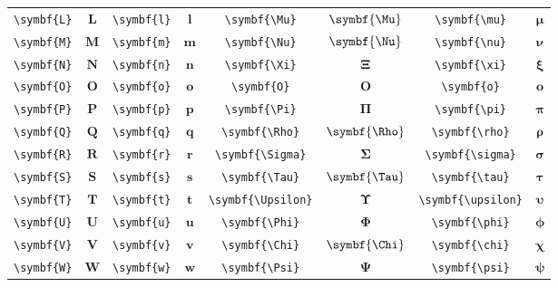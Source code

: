 \begin{longtable}{cccccccc}
    \verb|\symbf{L}| & \(\symbf{L}\) & \verb|\symbf{l}| & \(\symbf{l}\) & \verb|\symbf{\Mu}|      & \(\symbf{\Mu}\)      & \verb|\symbf{\mu}|         & \(\symbf{\mu}\)         \\
    \verb|\symbf{M}| & \(\symbf{M}\) & \verb|\symbf{m}| & \(\symbf{m}\) & \verb|\symbf{\Nu}|      & \(\symbf{\Nu}\)      & \verb|\symbf{\nu}|         & \(\symbf{\nu}\)         \\
    \verb|\symbf{N}| & \(\symbf{N}\) & \verb|\symbf{n}| & \(\symbf{n}\) & \verb|\symbf{\Xi}|      & \(\symbf{\Xi}\)      & \verb|\symbf{\xi}|         & \(\symbf{\xi}\)         \\
    \verb|\symbf{O}| & \(\symbf{O}\) & \verb|\symbf{o}| & \(\symbf{o}\) & \verb|\symbf{O}|        & \(\symbf{O}\)        & \verb|\symbf{o}|           & \(\symbf{o}\)           \\
    \verb|\symbf{P}| & \(\symbf{P}\) & \verb|\symbf{p}| & \(\symbf{p}\) & \verb|\symbf{\Pi}|      & \(\symbf{\Pi}\)      & \verb|\symbf{\pi}|         & \(\symbf{\pi}\)         \\
    \verb|\symbf{Q}| & \(\symbf{Q}\) & \verb|\symbf{q}| & \(\symbf{q}\) & \verb|\symbf{\Rho}|     & \(\symbf{\Rho}\)     & \verb|\symbf{\rho}|        & \(\symbf{\rho}\)        \\
    \verb|\symbf{R}| & \(\symbf{R}\) & \verb|\symbf{r}| & \(\symbf{r}\) & \verb|\symbf{\Sigma}|   & \(\symbf{\Sigma}\)   & \verb|\symbf{\sigma}|      & \(\symbf{\sigma}\)      \\
    \verb|\symbf{S}| & \(\symbf{S}\) & \verb|\symbf{s}| & \(\symbf{s}\) & \verb|\symbf{\Tau}|     & \(\symbf{\Tau}\)     & \verb|\symbf{\tau}|        & \(\symbf{\tau}\)        \\
    \verb|\symbf{T}| & \(\symbf{T}\) & \verb|\symbf{t}| & \(\symbf{t}\) & \verb|\symbf{\Upsilon}| & \(\symbf{\Upsilon}\) & \verb|\symbf{\upsilon}|    & \(\symbf{\upsilon}\)    \\
    \verb|\symbf{U}| & \(\symbf{U}\) & \verb|\symbf{u}| & \(\symbf{u}\) & \verb|\symbf{\Phi}|     & \(\symbf{\Phi}\)     & \verb|\symbf{\phi}|        & \(\symbf{\phi}\)        \\
    \verb|\symbf{V}| & \(\symbf{V}\) & \verb|\symbf{v}| & \(\symbf{v}\) & \verb|\symbf{\Chi}|     & \(\symbf{\Chi}\)     & \verb|\symbf{\chi}|        & \(\symbf{\chi}\)        \\
    \verb|\symbf{W}| & \(\symbf{W}\) & \verb|\symbf{w}| & \(\symbf{w}\) & \verb|\symbf{\Psi}|     & \(\symbf{\Psi}\)     & \verb|\symbf{\psi}|        & \(\symbf{\psi}\)        \\

\end{longtable}
